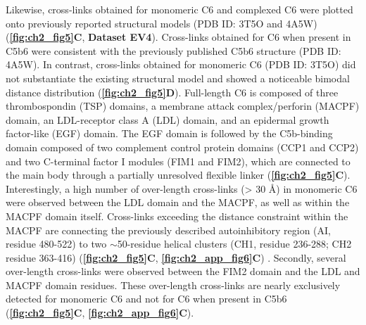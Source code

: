 Likewise, cross-links obtained for monomeric C6 and complexed C6 were plotted onto previously reported structural models (PDB ID: 3T5O and 4A5W) (\textbf{\autoref{fig:ch2_fig5}C}, \textbf{Dataset EV4}). Cross-links obtained for C6 when present in C5b6 were consistent with the previously published C5b6 structure (PDB ID: 4A5W). In contrast, cross-links obtained for monomeric C6 (PDB ID: 3T5O) did not substantiate the existing structural model and showed a noticeable bimodal distance distribution (\textbf{\autoref{fig:ch2_fig5}D}). Full-length C6 is composed of three thrombospondin (TSP) domains, a membrane attack complex/perforin (MACPF) domain, an LDL-receptor class A (LDL) domain, and an epidermal growth factor-like (EGF) domain. The EGF domain is followed by the C5b-binding domain composed of two complement control protein domains (CCP1 and CCP2) and two C-terminal factor I modules (FIM1 and FIM2), which are connected to the main body through a partially unresolved flexible linker (\textbf{\autoref{fig:ch2_fig5}C}). Interestingly, a high number of over-length cross-links (> 30 Å) in monomeric C6 were observed between the LDL domain and the MACPF, as well as within the MACPF domain itself. Cross-links exceeding the distance constraint within the MACPF are connecting the previously described autoinhibitory region (AI, residue 480-522) to two $\sim$50-residue helical clusters (CH1, residue 236-288; CH2 residue 363-416) (\textbf{\autoref{fig:ch2_fig5}C}, \textbf{\autoref{fig:ch2_app_fig6}C}) \cite{Hadders_2012}. Secondly, several over-length cross-links were observed between the FIM2 domain and the LDL and MACPF domain residues. These over-length cross-links are nearly exclusively detected for monomeric C6 and not for C6 when present in C5b6 (\textbf{\autoref{fig:ch2_fig5}C}, \textbf{\autoref{fig:ch2_app_fig6}C}).

